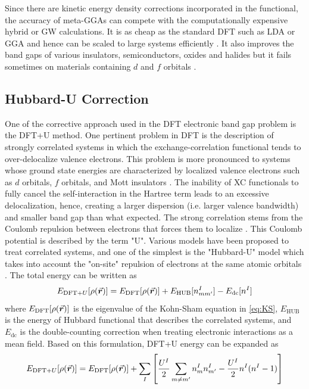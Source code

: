 Since there are kinetic energy density corrections incorporated in the functional, the accuracy of meta-GGAs can compete with the computationally expensive hybrid or GW calculations. It is as cheap as the standard DFT such as LDA or GGA and hence can be scaled to large systems efficiently \citep{Tran2009}. It also improves the band gaps of various insulators, semiconductors, oxides and halides but it fails sometimes on materials containing $d$ and $f$ orbitals \citep{Singh2010,Singh2010a}. 


\subsection{Hubbard-U Correction}
One of the corrective approach used in the DFT electronic band gap problem is the DFT+U method. One pertinent problem in DFT is the description of strongly correlated systems in which the exchange-correlation functional tends to over-delocalize valence electrons. This problem is more pronounced to systems whose ground state energies are characterized by localized valence electrons such as $d$ orbitals, $f$ orbitals, and Mott insulators \citep{Himmetoglu2013}. The inability of XC functionals to fully cancel the self-interaction in the Hartree term leads to an excessive delocalization, hence, creating a larger dispersion (i.e. larger valence bandwidth) and smaller band gap than what expected. The strong correlation stems from the Coulomb repulsion between electrons that forces them to localize \citep{Shen1991}. This Coulomb potential is described by the term "U". Various models have been proposed to treat correlated systems, and one of the simplest is the "Hubbard-U" model which takes into account the "on-site" repulsion of electrons at the same atomic orbitals \citep{Tolba2018}. The total energy can be written as \citep{Liechtenstein1995,Dudarev1998,Cococcioni2005}
\begin{equation}
	E_{\text{DFT}+U} [\rho({\va*{r}})] = E_{\text{DFT}} [\rho({\va*{r}})] + E_{\text{HUB}}[{n^I_{mm'}}] - E_{\text{dc}} [n^I]
\end{equation}
where $E_{\text{DFT}} [\rho({\va*{r}})]$ is the eigenvalue of the Kohn-Sham equation in \eqref{eq:KS}, $E_{\text{HUB}}$ is the energy of Hubbard functional that describes the correlated systems, and $E_{\text{dc}}$ is the double-counting correction when treating electronic interactions as a mean field. Based on this formulation, DFT+U energy can be expanded as 
\begin{equation}
	E_{\text{DFT}+U} [\rho({\va*{r}})] = E_{\text{DFT}} [\rho({\va*{r}})] + \sum_I \left[\frac{U^I}{2} \sum_{m \neq m'}  {n^I_{m}} {n^I_{m'}} - \frac{U^I}{2} n^I (n^I - 1)\right] 
\end{equation}
